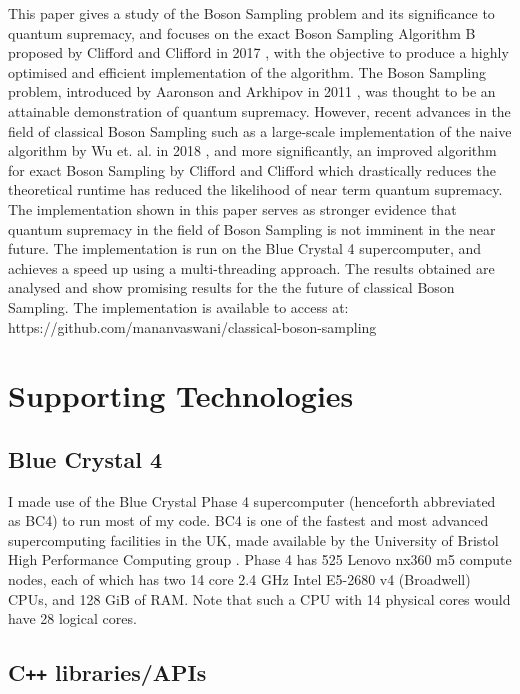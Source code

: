 \documentclass[ %
                    author={Manan Vaswani},
                supervisor={Dr. Raphael Clifford},
                    degree={MEng},
                     title={A multi-core CPU implementation of the classical Boson Sampling algorithm},
                  subtitle={},
                      type={},
                      year={2019} ]{dissertation}
\theoremstyle{plain}
\theoremstyle{definition}
\begin{document}
This paper gives a study of the Boson Sampling problem and its significance to quantum supremacy, and focuses on the exact Boson Sampling Algorithm B proposed by Clifford and Clifford in 2017 \cite{clifford17}, with the objective to produce a highly optimised and efficient implementation of the algorithm. The Boson Sampling problem, introduced by Aaronson and Arkhipov in 2011 \cite{aaronson2011}, was thought to be an attainable demonstration of quantum supremacy. However, recent advances in the field of classical Boson Sampling such as a large-scale implementation of the naive algorithm by Wu et. al. in 2018 \cite{wu2018}, and more significantly, an improved algorithm for exact Boson Sampling by Clifford and Clifford which drastically reduces the theoretical runtime has reduced the likelihood of near term quantum supremacy. The implementation shown in this paper serves as stronger evidence that quantum supremacy in the field of Boson Sampling is not imminent in the near future. The implementation is run on the Blue Crystal 4 supercomputer, and achieves a speed up using a multi-threading approach. The results obtained are analysed and show promising results for the the future of classical Boson Sampling.
The implementation is available to access at: https://github.com/mananvaswani/classical-boson-sampling



\chapter*{Supporting Technologies}

\section{Blue Crystal 4} \label{sec:bc4}
I made use of the Blue Crystal Phase 4 supercomputer (henceforth abbreviated as BC4) to run most of my code. BC4 is one of the fastest and most advanced supercomputing facilities in the UK, made available by the University of Bristol High Performance Computing group \cite{blue_crystal}. Phase 4 has 525 Lenovo nx360 m5 compute nodes, each of which has two 14 core 2.4 GHz Intel E5-2680 v4 (Broadwell) CPUs, and 128 GiB of RAM. Note that such a CPU with 14 physical cores would have 28 logical cores.

\section{C\texttt{++} libraries/APIs}
\end{document}

